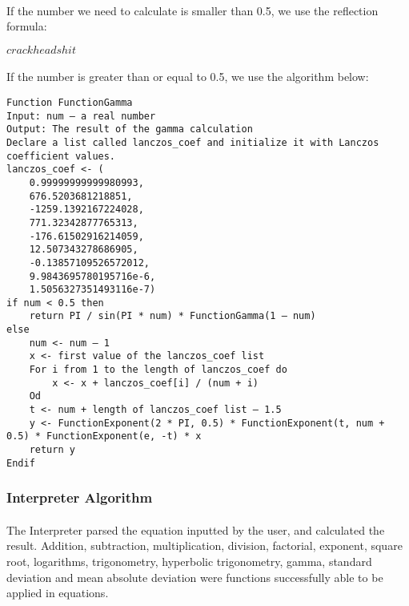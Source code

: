 \begin{itemize}
            \paragraph{}
            If the number we need to calculate is smaller than 0.5, we use the reflection formula:

            \begin{center}
                $crackheadshit$
            \end{center}

            \paragraph{}
            If the number is greater than or equal to 0.5, we use the algorithm below:

            \begin{lstlisting}
Function FunctionGamma
Input: num – a real number
Output: The result of the gamma calculation
Declare a list called lanczos_coef and initialize it with Lanczos coefficient values.
lanczos_coef <- (
    0.99999999999980993,
    676.5203681218851,
    -1259.1392167224028,
    771.32342877765313,
    -176.61502916214059,
    12.507343278686905,
    -0.13857109526572012,
    9.9843695780195716e-6,
    1.5056327351493116e-7)
if num < 0.5 then
	return PI / sin(PI * num) * FunctionGamma(1 – num)
else
	num <- num – 1
	x <- first value of the lanczos_coef list
	For i from 1 to the length of lanczos_coef do
		x <- x + lanczos_coef[i] / (num + i)
	Od
	t <- num + length of lanczos_coef list – 1.5
	y <- FunctionExponent(2 * PI, 0.5) * FunctionExponent(t, num + 0.5) * FunctionExponent(e, -t) * x
    return y
Endif
            \end{lstlisting}

    \end{itemize}

    \subsubsection{Interpreter Algorithm}
        \paragraph{}
        The Interpreter parsed the equation inputted by the user, and calculated the result. Addition, subtraction, multiplication, division, factorial, exponent, square root,  logarithms, trigonometry, hyperbolic trigonometry, gamma, standard deviation and mean absolute deviation were functions successfully able to be applied in equations.

